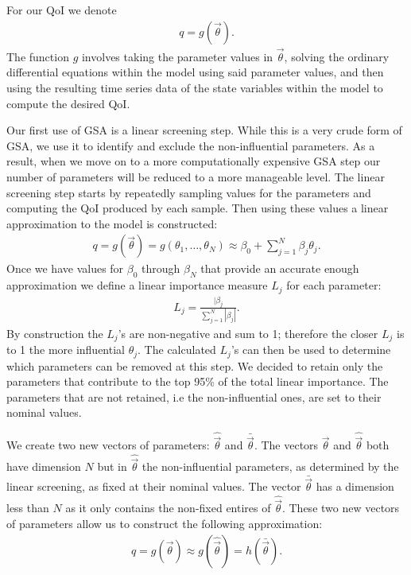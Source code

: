 \documentclass[10pt,letterpaper]{article}
\begin{document}
	For our QoI we denote 
	\begin{align}
		q=g(\vec{\theta}).
	\end{align} The function $g$ involves taking the parameter values in $\vec{\theta}$, solving the ordinary differential equations within the model using said parameter values, and then using the resulting time series data of the state variables within the model to compute the desired QoI. 
	
	Our first use of GSA is a linear screening step. While this is a very crude form of GSA, we use it to identify and exclude the non-influential parameters. As a result, when we move on to a more computationally expensive GSA step our number of parameters will be reduced to a more manageable level. The linear screening step starts by repeatedly sampling values for the parameters and computing the QoI produced by each sample. Then using these values a linear approximation to the model is constructed:
	\begin{align}
		q=g(\vec{\theta})=g(\theta_1,\ldots,\theta_N)\approx \beta_0+\sum_{j=1}^N\beta_j\theta_j.
	\end{align}
	Once we have values for $\beta_0$ through $\beta_N$ that provide an accurate enough approximation we define a linear importance measure $L_j$ for each parameter:
	\begin{align}
		L_j=\frac{|\beta_j}{\sum_{j=1}^N|\beta_j|}.
	\end{align}
	By construction the $L_j$'s are non-negative and sum to 1; therefore the closer $L_j$ is to 1 the more influential $\theta_j$. The calculated $L_j$'s can then be used to determine which parameters can be removed at this step. We decided to retain only the parameters that contribute to the top 95\% of the total linear importance. The parameters that are not retained, i.e the non-influential ones, are set to their nominal values. 
	
	We create two new vectors of parameters: $\hat{\vec{\theta}}$ and $\bar{\vec{\theta}}$. The vectors $\vec{\theta}$ and $\hat{\vec{\theta}}$ both have dimension $N$ but in $\hat{\vec{\theta}}$ the non-influential parameters, as determined by the linear screening, as fixed at their nominal values. The vector $\bar{\vec{\theta}}$ has a dimension less than $N$ as it only contains the non-fixed entires of $\hat{\vec{\theta}}$. These two new vectors of parameters allow us to construct the following approximation:
	\begin{align}
		q=g(\vec{\theta})\approx g(\hat{\vec{\theta}}) = h(\bar{\vec{\theta}}).
	\end{align}
	
\end{document}
